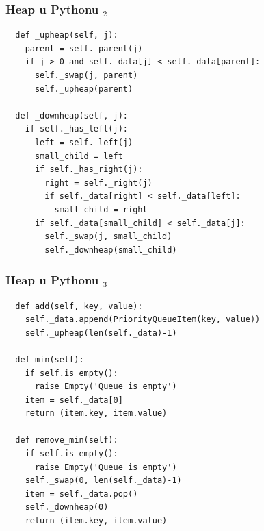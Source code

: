 \documentclass[compress,aspectratio=169]{beamer}
\begin{document}
\begin{frame}
  \frametitle{Heap u Pythonu $_2$}
\begin{verbatim}
  def _upheap(self, j):
    parent = self._parent(j)
    if j > 0 and self._data[j] < self._data[parent]:
      self._swap(j, parent)
      self._upheap(parent)
  
  def _downheap(self, j):
    if self._has_left(j):
      left = self._left(j)
      small_child = left
      if self._has_right(j):
        right = self._right(j)
        if self._data[right] < self._data[left]:
          small_child = right
      if self._data[small_child] < self._data[j]:
        self._swap(j, small_child)
        self._downheap(small_child)
\end{verbatim}
\end{frame}

\begin{frame}
  \frametitle{Heap u Pythonu $_3$}
\begin{verbatim}
  def add(self, key, value):
    self._data.append(PriorityQueueItem(key, value))
    self._upheap(len(self._data)-1)
    
  def min(self):
    if self.is_empty():
      raise Empty('Queue is empty')
    item = self._data[0]
    return (item.key, item.value)
    
  def remove_min(self):
    if self.is_empty():
      raise Empty('Queue is empty')
    self._swap(0, len(self._data)-1)
    item = self._data.pop()
    self._downheap(0)
    return (item.key, item.value)  
\end{verbatim}
\end{frame}
\end{document}
